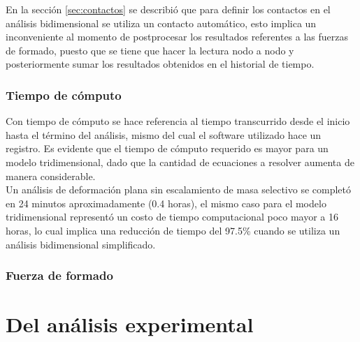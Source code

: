 En la sección \ref{sec:contactos} se describió que para definir los contactos en el 
análisis bidimensional se utiliza un contacto automático, esto implica un inconveniente 
al momento de postprocesar los resultados referentes a las fuerzas de formado, puesto 
que se tiene que hacer la lectura nodo a nodo y posteriormente sumar los resultados 
obtenidos en el historial de tiempo.\\

\subsubsection{Tiempo de cómputo}

Con tiempo de cómputo se hace referencia al tiempo transcurrido desde el inicio hasta el 
término del análisis, mismo del cual el software utilizado hace un registro. 
Es evidente que el tiempo de cómputo requerido es mayor para un modelo tridimensional, dado 
que la cantidad de ecuaciones a resolver aumenta de manera considerable.\\

Un análisis de deformación plana sin escalamiento de masa selectivo se completó en 24 minutos 
aproximadamente (0.4 horas), el mismo caso para el modelo tridimensional representó 
un costo de tiempo computacional poco mayor a 16 horas, lo cual implica una reducción de tiempo 
del 97.5\% cuando se utiliza un análisis bidimensional simplificado.

\subsubsection{Fuerza de formado}



\section{Del análisis experimental}



